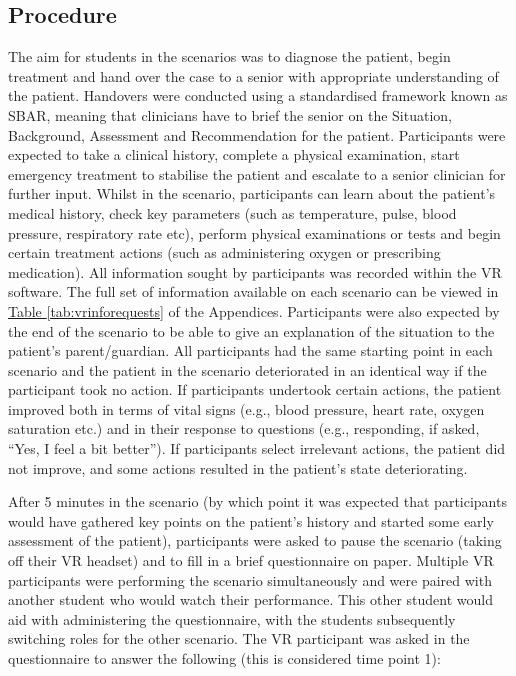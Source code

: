 \documentclass[a4paper, nobind]{templates/ociamthesis}
\begin{document}
\subsection{Procedure}\label{procedure-2}

The aim for students in the scenarios was to diagnose the patient, begin treatment and hand over the case to a senior with appropriate understanding of the patient. Handovers were conducted using a standardised framework known as SBAR, meaning that clinicians have to brief the senior on the Situation, Background, Assessment and Recommendation for the patient. Participants were expected to take a clinical history, complete a physical examination, start emergency treatment to stabilise the patient and escalate to a senior clinician for further input. Whilst in the scenario, participants can learn about the patient's medical history, check key parameters (such as temperature, pulse, blood pressure, respiratory rate etc), perform physical examinations or tests and begin certain treatment actions (such as administering oxygen or prescribing medication). All information sought by participants was recorded within the VR software. The full set of information available on each scenario can be viewed in \hyperref[tab:vrinforequests]{Table \ref{tab:vrinforequests}} of the Appendices. Participants were also expected by the end of the scenario to be able to give an explanation of the situation to the patient's parent/guardian. All participants had the same starting point in each scenario and the patient in the scenario deteriorated in an identical way if the participant took no action. If participants undertook certain actions, the patient improved both in terms of vital signs (e.g., blood pressure, heart rate, oxygen saturation etc.) and in their response to questions (e.g., responding, if asked, ``Yes, I feel a bit better''). If participants select irrelevant actions, the patient did not improve, and some actions resulted in the patient's state deteriorating.

\hfill\break
After 5 minutes in the scenario (by which point it was expected that participants would have gathered key points on the patient's history and started some early assessment of the patient), participants were asked to pause the scenario (taking off their VR headset) and to fill in a brief questionnaire on paper. Multiple VR participants were performing the scenario simultaneously and were paired with another student who would watch their performance. This other student would aid with administering the questionnaire, with the students subsequently switching roles for the other scenario. The VR participant was asked in the questionnaire to answer the following (this is considered time point 1):
\end{document}

